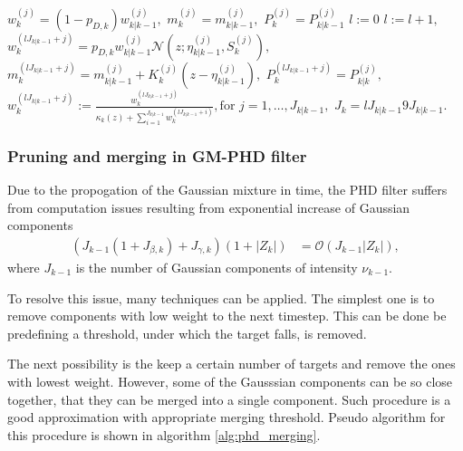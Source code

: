 \begin{algorithm}[h]
\begin{algorithmic}[1]
        \State
         
            \State $w_k^{(j)} = (1 - p_{D,k}) w_{k|k-1}^{(j)},$ \quad
             $m_k^{(j)} = m_{k|k-1}^{(j)},$ \quad
             $P_k^{(j)} = P_{k|k-1}^{(j)}$
        \EndFor
        \State $l:=0$
         
            \State $l:=l+1,$
                \State $w_k^{(l J_{k|k-1} + j)} = p_{D,k} w_{k|k-1}^{(j)} \mathcal{N}(z; \eta_{k|k-1}^{(j)},S_k^{(j)}),$
                \State $m_k^{(l J_{k|k-1} + j)} = m_{k|k-1}^{(j)} + K_k^{(j)} (z - \eta_{k|k-1}^{(j)}),$
                \State $P_k^{(l J_{k|k-1} + j)} = P_{k|k}^{(j)},$
            \EndFor
        \State $w_k^{(l J_{k|k-1} + j)} := \frac{w_k^{(l J_{k|k-1} + j)}}{\kappa_k(z) + \sum_{i=1}^{J_{k|k-1}} w_k^{(
            l J_{k|k-1} + i)}}, \text{for $j = 1,\dots,J_{k|k-1}$},$
        \EndFor
        \State $J_k = l J_{k|k-1} 9 J_{k|k-1}.$
        \EndProcedure

    \end{algorithmic}
    \label{alg:phd}
\end{algorithm}

        \subsubsection{Pruning and merging in GM-PHD filter}
Due to the propogation of the Gaussian mixture in time, the PHD filter suffers from computation issues resulting from exponential increase of Gaussian components
\begin{align}
(J_{k-1} (1 + J_{\beta,k}) + J_{\gamma,k}) (1 + |Z_k|) &= \mathcal{O}(J_{k-1} |Z_k|),
\end{align}
where $J_{k-1}$ is the number of Gaussian components of intensity $\nu_{k-1}$.

To resolve this issue, many techniques can be applied. The simplest one is to remove components with low weight to the next timestep. This can be done be predefining a threshold, under which the target falls, is removed.

The next possibility is the keep a certain number of targets and remove the ones with lowest weight. However, some of the Gausssian components can be so close together, that they can be merged into a single component. Such procedure is a good approximation with appropriate merging threshold. Pseudo algorithm for this procedure is shown in algorithm \ref{alg:phd_merging}.

